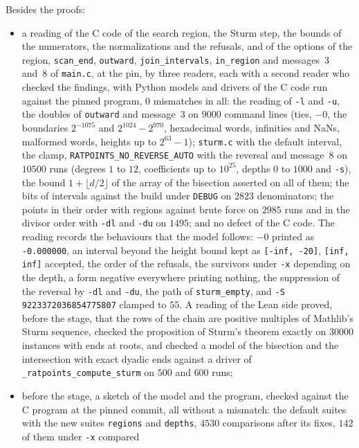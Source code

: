 Besides the proofs:
\begin{itemize}
  \item a reading of the C code of the search region, the Sturm step, the bounds of the numerators,
    the normalizations and the refusals, and of the options of the region, \verb|scan_end|,
    \verb|outward|, \verb|join_intervals|, \verb|in_region| and messages~3 and~8 of \verb|main.c|,
    at the pin, by three readers, each with a second reader who checked the findings, with Python
    models and drivers of the C code run against the pinned program, $0$ mismatches in all: the
    reading of \verb|-l| and \verb|-u|, the doubles of \verb|outward| and message~3 on $9000$
    command lines (ties, $-0$, the boundaries $2^{-1075}$ and $2^{1024} - 2^{970}$, hexadecimal
    words, infinities and NaNs, malformed words, heights up to $2^{63} - 1$); \verb|sturm.c| with
    the default interval, the clamp, \verb|RATPOINTS_NO_REVERSE_AUTO| with the reversal and
    message~8 on $10500$ runs (degrees $1$ to $12$, coefficients up to $10^{25}$, depths $0$ to
    $1000$ and \verb|-s|), the bound $1 + \lfloor d/2 \rfloor$ of the array of the bisection
    asserted on all of them; the bits of intervals against the build under \verb|DEBUG| on $2823$
    denominators; the points in their order with regions against brute force on $2985$ runs and in
    the divisor order with \verb|-dl| and \verb|-du| on $1495$; and no defect of the C code. The
    reading records the behaviours that the model follows: $-0$ printed as \verb|-0.000000|, an
    interval beyond the height bound kept as \verb|[-inf, -20]|, \verb|[inf, inf]| accepted, the
    order of the refusals, the survivors under \verb|-x| depending on the depth, a form negative
    everywhere printing nothing, the suppression of the reversal by \verb|-dl| and \verb|-du|, the
    path of \verb|sturm_empty|, and \verb|-S 9223372036854775807| clamped to $55$. A reading of the
    Lean side proved, before the stage, that the rows of the chain are positive multiples of
    Mathlib's Sturm sequence, checked the proposition of Sturm's theorem exactly on $30000$
    instances with ends at roots, and checked a model of the bisection and the intersection with
    exact dyadic ends against a driver of \verb|_ratpoints_compute_sturm| on $500$ and $600$ runs;
  \item before the stage, a sketch of the model and the program, checked against the C program at
    the pinned commit, all without a mismatch: the default suites with the new suites \verb|regions|
    and \verb|depths|, $4530$ comparisons after its fixes, $142$ of them under \verb|-x| compared

\end{itemize}
